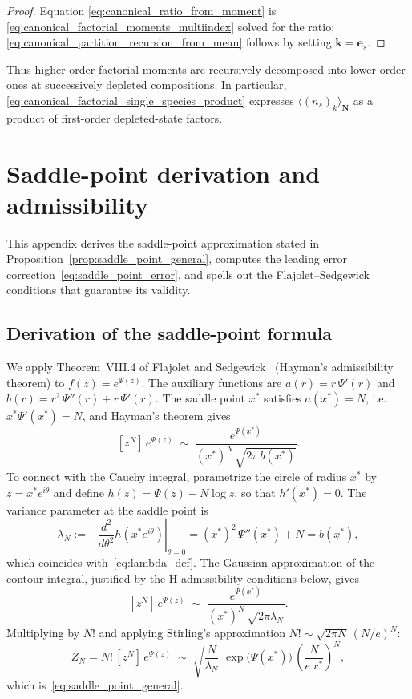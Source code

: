 \documentclass[11pt]{amsart}
\newcommand{\GFensemble}{Z}
\newcommand{\GFcomb}{\Psi}
\theoremstyle{definition}
\theoremstyle{plain}
\theoremstyle{remark}
\begin{document}
\begin{proof}
Equation \eqref{eq:canonical_ratio_from_moment} is \eqref{eq:canonical_factorial_moments_multiindex} solved for the ratio; \eqref{eq:canonical_partition_recursion_from_mean} follows by setting $\mathbf{k}=\mathbf{e}_s$.
\end{proof}

Thus higher-order factorial moments are recursively decomposed into lower-order ones at successively depleted compositions.
In particular, \eqref{eq:canonical_factorial_single_species_product} expresses $\langle (n_s)_k\rangle_{\mathbf{N}}$ as a product of first-order depleted-state factors.


\section{Saddle-point derivation and admissibility}
\label{app:saddle}

This appendix derives the saddle-point approximation stated in Proposition~\ref{prop:saddle_point_general}, computes the leading error correction~\eqref{eq:saddle_point_error}, and spells out the Flajolet--Sedgewick conditions that guarantee its validity.

\subsection{Derivation of the saddle-point formula}

We apply Theorem~VIII.4 of Flajolet and Sedgewick~\cite{flajolet2009analytic} (Hayman's admissibility theorem) to $f(z)=e^{\GFcomb(z)}$.
The auxiliary functions are $a(r) = r\,\GFcomb'(r)$ and $b(r) = r^2\,\GFcomb''(r) + r\,\GFcomb'(r)$.
The saddle point $x^*$ satisfies $a(x^*)=N$, i.e.\ $x^*\GFcomb'(x^*)=N$, and Hayman's theorem gives
\[
[z^N]\,e^{\GFcomb(z)}
\;\sim\;
\frac{e^{\GFcomb(x^*)}}{(x^*)^N\,\sqrt{2\pi\,b(x^*)}}.
\]
To connect with the Cauchy integral, parametrize the circle of radius $x^*$ by $z = x^*e^{i\theta}$ and define $h(z) = \GFcomb(z) - N\log z$, so that $h'(x^*)=0$.
The variance parameter at the saddle point is
\[
\lambda_N := -\left.\frac{d^2}{d\theta^2}h(x^*e^{i\theta})\right|_{\theta=0}
= (x^*)^2\,\GFcomb''(x^*) + N = b(x^*),
\]
which coincides with~\eqref{eq:lambda_def}.
The Gaussian approximation of the contour integral, justified by the H-admissibility conditions below, gives
\begin{equation}\label{eq:app_gaussian_eval}
[z^N]\,e^{\GFcomb(z)}
\;\sim\;
\frac{e^{\GFcomb(x^*)}}{(x^*)^N\,\sqrt{2\pi\lambda_N}}.
\end{equation}
Multiplying by $N!$ and applying Stirling's approximation $N!\sim \sqrt{2\pi N}\,(N/e)^N$:
\[
\GFensemble_N
= N!\,[z^N]\,e^{\GFcomb(z)}
\;\sim\;
\sqrt{\frac{N}{\lambda_N}}\;\exp\!\bigl(\GFcomb(x^*)\bigr)\,
\left(\frac{N}{e\,x^*}\right)^{\!N},
\]
which is~\eqref{eq:saddle_point_general}.
\end{document}
